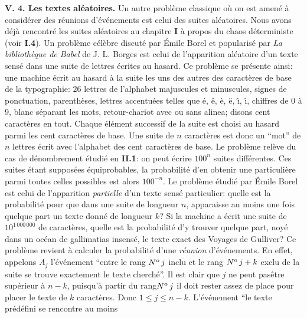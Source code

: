 {\bf V\ata . 4. Les textes al\'eatoires.}
\medskip
Un autre probl\`eme classique o\`u on est amen\'e \`a consid\'erer des
r\'eunions d'\'ev\'enements est celui des suites al\'eatoires. Nous avons 
d\'ej\`a rencontr\'e les suites al\'eatoires au chapitre {\bf I} \`a propos
du chaos d\'eterministe (voir {\bf I.4}).  Un probl\`eme c\'el\`ebre 
discut\'e par \'Emile Borel et popularis\'e par {\it La biblioth\`eque de
Babel} de J. L. Borges est celui de
l'apparition  al\'eatoire d'un texte sens\'e dans une suite de lettres
\'ecrites au  hasard.
\medskip
Ce probl\`eme se pr\'esente ainsi: une machine \'ecrit au hasard \`a la 
suite les uns des autres des caract\`eres de base de la typographie: $26$
lettres de l'alphabet majuscules et minuscules, signes de ponctuation,
parenth\`eses, lettres accentu\'ees telles que \'e, \^e, \`e, \"e, \^\i , 
\"\i , chiffres de 0 \`a 9, blanc s\'eparant les mots, retour-chariot avec 
ou  sans alinea; disons cent caract\`eres en tout. Chaque \'el\'ement 
successif de la suite est choisi au hasard parmi les cent caract\`eres de
base. Une suite  de $n$ caract\`eres est donc un ``mot'' de $n$ lettres
\'ecrit avec l'alphabet des cent caract\`eres de base. Le probl\`eme
rel\`eve du cas de d\'enombrement \'etudi\'e en {\bf II.1}: on peut
\'ecrire $100^n$ suites diff\'erentes. Ces suites \'etant suppos\'ees
\'equiprobables, la probabilit\'e d'en obtenir une particuli\`ere parmi
toutes celles possibles est alors $100^{-n}$.
\medskip
Le probl\`eme \'etudi\'e par \'Emile Borel est celui de l'apparition {\it 
partielle} d'un texte sens\'e particulier: quelle est la probabilit\'e pour 
que dans une suite de longueur $n$, apparaisse au moins une fois quelque
part un texte donn\'e de longueur $k$? Si la machine a \'ecrit une suite 
de $10^{1\, 000\, 000}$ de caract\`eres, quelle est la probabilit\'e d'y
trouver  quelque part, noy\'e dans un oc\'ean de gallimatias insens\'e, le
texte exact  des Voyages de Gulliver? 
\medskip
Ce probl\`eme revient \`a calculer la probabilit\'e d'une {\it r\'eunion}
d'\'ev\'e\-ne\-ments.  En effet, appelons $A_j$ l'\'ev\'enement ``entre le
rang $N^{\rm o}\, j$ inclu et le rang $N^{\rm o}\, j+k$ exclu de la suite
se trouve
exactement le texte cherch\'e''.  Il est clair que $j$ ne peut pas\^etre
sup\'erieur \`a $n-k$,  puisqu'\`a partir du rang$N^{\rm o}\, j$ il doit rester assez de place pour placer le texte de $k$
caract\`eres.  Donc $1 \leq j \leq n-k$.  L'\'ev\'enement ``le texte
pr\'ed\'efini se rencontre au moins
